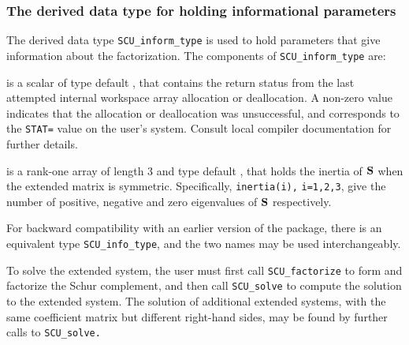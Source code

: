 \documentclass{galahad}
\newcommand{\packagename}{SCU}
\begin{document}
\subsubsection{The derived data type for holding informational
 parameters}\label{typeinfo}
The derived data type 
{\tt \packagename\_inform\_type} 
is used to hold parameters that give information about the factorization.
The components of
{\tt \packagename\_inform\_type} 
are:

\begin{description}
 is a scalar of type default \integer, that contains 
the return status from the last attempted internal  
workspace array allocation or deallocation. 
A non-zero value indicates that the allocation or deallocation was
 unsuccessful, and corresponds to the {\tt STAT=} value on the user's system. 
Consult local compiler documentation for further details. 
 
 is a rank-one array of length 3 and type default \integer, 
that holds the inertia of ${\mathbf{S}}$ when the extended matrix is symmetric. 
Specifically, {\tt inertia(i),} {\tt i=1,2,3},  
give the number of positive, negative and zero eigenvalues of  
${\mathbf{S}}$ respectively. 
 
\end{description}

\noindent
For backward compatibility with an earlier version of the package, there
is an equivalent type {\tt \packagename\_info\_type}, and the two names
may be used interchangeably.


\galarguments
To solve the extended system, 
the user must first call {\tt \packagename\_factorize} to form and factorize 
the Schur complement, 
and then call {\tt \packagename\_solve} to compute the solution to the extended 
system. The solution of additional extended systems, with the 
same coefficient matrix but different right-hand sides, may 
be found by further calls to 
{\tt \packagename\_solve.} 
\end{document}

